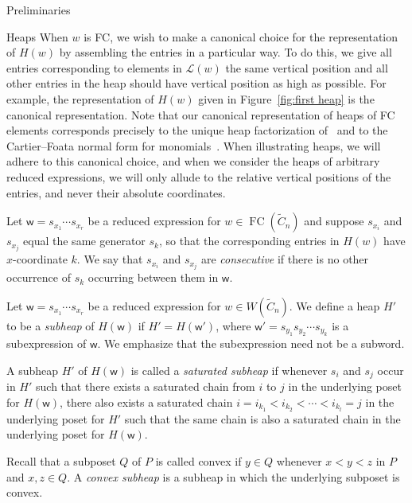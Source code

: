 \documentclass[11pt]{amsart}
\theoremstyle{definition}
\numberwithin{equation}{section}
\newcommand{\C}{\widetilde{C}}
\renewcommand{\L}{\mathcal{L}}
\renewcommand{\(}{\left(}
\renewcommand{\)}{\right)}
\newcommand{\w}{\mathsf{w}}
\DeclareMathOperator{\FC}{FC}
\begin{document}
\begin{section}{Preliminaries}
\begin{subsection}{Heaps}
When $w$ is FC, we wish to make a canonical choice for the representation of $H(w)$ by assembling the entries in a particular way.  To do this, we give all entries corresponding to elements in $\L(w)$ the same vertical position and all other entries in the heap should have vertical position as high as possible.  For example, the representation of $H(w)$ given in Figure~\ref{fig:first heap} is the canonical representation.  Note that our canonical representation of heaps of FC elements corresponds precisely to the unique heap factorization of~\cite[Lemma 2.9]{Viennot1986} and to the Cartier--Foata normal form for monomials~\cite{Cartier1969,Green2006a}.  When illustrating heaps, we will adhere to this canonical choice, and when we consider the heaps of arbitrary reduced expressions, we will only allude to the relative vertical positions of the entries, and never their absolute coordinates.  

Let $\w=s_{x_1}\cdots s_{x_r}$ be a reduced expression for $w \in \FC(\C_n)$ and suppose $s_{x_i}$ and $s_{x_j}$ equal the same generator $s_k$, so that the corresponding entries in $H(w)$ have $x$-coordinate $k$.  We say that $s_{x_i}$ and $s_{x_j}$ are \emph{consecutive} if there is no other occurrence of $s_{k}$ occurring between them in $\w$.

Let $\w=s_{x_{1}} \cdots s_{x_{r}}$ be a reduced expression for $w \in W(\C_{n})$.  We define a heap $H'$ to be a \emph{subheap} of $H(\w)$ if $H'=H(\w')$, where $\w'=s_{y_1}s_{y_2} \cdots s_{y_k}$ is a subexpression of $\w$.  We emphasize that the subexpression need not be a subword.

A subheap $H'$ of $H(\w)$ is called a \emph{saturated subheap} if whenever $s_{i}$ and $s_{j}$ occur in $H'$ such that there exists a saturated chain from $i$ to $j$ in the underlying poset for $H(\w)$, there also exists a saturated chain $i=i_{k_{1}}<i_{k_{2}}< \cdots < i_{k_{l}}=j$ in the underlying poset for $H'$ such that the same chain is also a saturated chain in the underlying poset for $H(\w)$.

Recall that a subposet $Q$ of $P$ is called convex if $y \in Q$ whenever $x < y < z$ in $P$ and $x, z \in Q$.  A \emph{convex subheap} is a subheap in which the underlying subposet is convex.


\end{subsection}
\end{section}
\end{document}
